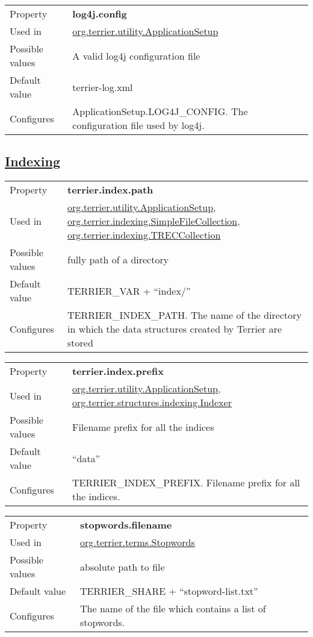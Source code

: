 \begin{longtable}[]{@{}ll@{}}
\toprule
Property & \textbf{log4j.config}\tabularnewline
Used in &
\href{javadoc/org/terrier/utility/ApplicationSetup.html}{org.terrier.utility.ApplicationSetup}\tabularnewline
Possible values & A valid log4j configuration file\tabularnewline
Default value & terrier-log.xml\tabularnewline
Configures & ApplicationSetup.LOG4J\_CONFIG. The configuration file used
by log4j.\tabularnewline
\bottomrule
\end{longtable}

\hypertarget{indexing}{\subsection{\texorpdfstring{\href{}{Indexing}}{Indexing}}\label{indexing}}

\begin{longtable}[]{@{}ll@{}}
\toprule
Property & \textbf{terrier.index.path}\tabularnewline
Used in &
\href{javadoc/org/terrier/utility/ApplicationSetup.html}{org.terrier.utility.ApplicationSetup},
\href{javadoc/org/terrier/indexing/SimpleFileCollection.html}{org.terrier.indexing.SimpleFileCollection},
\href{javadoc/org/terrier/indexing/TRECCollection.html}{org.terrier.indexing.TRECCollection}\tabularnewline
Possible values & fully path of a directory\tabularnewline
Default value & TERRIER\_VAR + ``index/''\tabularnewline
Configures & TERRIER\_INDEX\_PATH. The name of the directory in which
the data structures created by Terrier are stored\tabularnewline
\bottomrule
\end{longtable}

\begin{longtable}[]{@{}ll@{}}
\toprule
Property & \textbf{terrier.index.prefix}\tabularnewline
Used in &
\href{javadoc/org/terrier/utility/ApplicationSetup.html}{org.terrier.utility.ApplicationSetup},
\href{javadoc/org/terrier/structures/indexing/Indexer.html}{org.terrier.structures.indexing.Indexer}\tabularnewline
Possible values & Filename prefix for all the indices\tabularnewline
Default value & ``data''\tabularnewline
Configures & TERRIER\_INDEX\_PREFIX. Filename prefix for all the
indices.\tabularnewline
\bottomrule
\end{longtable}

\begin{longtable}[]{@{}ll@{}}
\toprule
Property & \textbf{stopwords.filename}\tabularnewline
Used in &
\href{javadoc/org/terrier/terms/Stopwords.html}{org.terrier.terms.Stopwords}\tabularnewline
Possible values & absolute path to file\tabularnewline
Default value & TERRIER\_SHARE + ``stopword-list.txt''\tabularnewline
Configures & The name of the file which contains a list of
stopwords.\tabularnewline
\bottomrule
\end{longtable}

